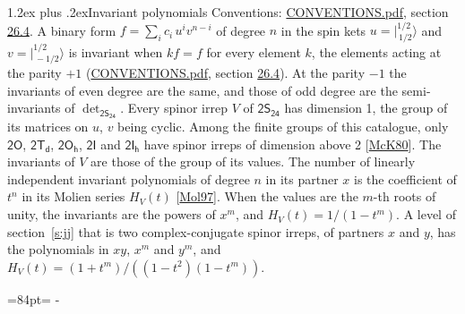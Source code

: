 \documentclass[10pt,a4paper]{article}
\makeatletter
\renewcommand\section{\@startsection{section}{1}{\z@}{-3ex plus -1ex minus -.2ex}%
  {1.2ex plus .2ex}{\normalfont\large\sffamily\bfseries\color{parttitle}}}
\newcommand{\needspace}[1]{\par\penalty-100\begingroup\dimen0=#1\relax\dimen2=\pagegoal
  \advance\dimen2-\pagetotal\ifdim\dimen0>\dimen2\relax\ifdim\dimen2>0pt\vfil\break\fi\fi
  \endgroup}
\numberwithin{equation}{section}
\newcommand{\grp}[1]{\mathsf{#1}}
\newcommand{\jm}[2]{\bigl\lvert{}^{#1}_{\,#2}\bigr\rangle}
\makeatother
\begin{document}
\section{Invariant polynomials}\label{s:invariants}
Conventions: \href{../../CONVENTIONS.pdf}{CONVENTIONS.pdf}, section \href{../../CONVENTIONS.pdf\#conv.26.4}{26.4}.
\leavevmode\label{n:local.binary.form}A binary form $f = \sum_i c_i\, u^i v^{n-i}$ of degree $n$ in the spin kets $u = \jm{1/2}{1/2}$ and $v = \jm{1/2}{-1/2}$ is invariant when $k f = f$ for every element $k$, the elements acting at the parity $+1$ (\href{../../CONVENTIONS.pdf}{CONVENTIONS.pdf}, section \href{../../CONVENTIONS.pdf\#conv.26.4}{26.4}). At the parity $-1$ the invariants of even degree are the same, and those of odd degree are the semi-invariants of $\det_{\grp{2S_{24}}}$.
\leavevmode\label{n:function.hilbert}Every spinor irrep $V$ of $\grp{2S_{24}}$ has dimension 1, the group of its matrices on $u$, $v$ being cyclic. Among the finite groups of this catalogue, only $\grp{2O}$, $\grp{2T_{d}}$, $\grp{2O_{h}}$, $\grp{2I}$ and $\grp{2I_{h}}$ have spinor irreps of dimension above 2 [\href{../../../REFERENCES.pdf\#ref.McK80}{McK80}]. The invariants of $V$ are those of the group of its values. \label{n:local.partner.x}The number of linearly independent invariant polynomials of degree $n$ in its partner $x$ is the coefficient of $t^n$ in its Molien series $H_V(t)$ [\href{../../../REFERENCES.pdf\#ref.Mol97}{Mol97}]. When the values are the $m$-th roots of unity, the invariants are the powers of $x^{m}$, and $H_V(t) = 1/(1 - t^{m})$. A level of section~\ref{s:jj} that is two complex-conjugate spinor irreps, of partners $x$ and $y$, has the polynomials in $xy$, $x^{m}$ and $y^{m}$, and $H_V(t) = (1 + t^{m})/((1 - t^{2})(1 - t^{m}))$.
\needspace{84pt}
\end{document}
